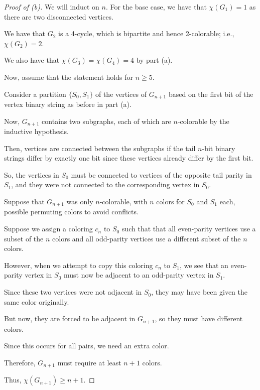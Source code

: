 \documentclass[../hw7]{subfiles}
\begin{document}
\begin{proof}[Proof of (b)]
	We will induct on $n$.
	For the base case, we have that $\chi(G_1)=1$ as there are two disconnected vertices.

	We have that $G_2$ is a 4-cycle, which is bipartite and hence 2-colorable; i.e., $\chi(G_2)=2$.

	We also have that $\chi(G_3)=\chi(G_4)=4$ by part (a).

	Now, assume that the statement holds for $n\ge 5$.

	Consider a partition $\{S_0,S_1\} $ of the vertices of $G_{n+1}$ based on the first bit of the vertex binary string as before in part (a).

	Now, $G_{n+1}$ contains two subgraphs, each of which are $n$-colorable by the inductive hypothesis.

	Then, vertices are connected between the subgraphs if the tail $n$-bit binary strings differ by exactly one bit since these vertices already differ by the first bit.

	So, the vertices in $S_0$ must be connected to vertices of the opposite tail parity in $S_1$, and they were not connected to the corresponding vertex in $S_0$.

	Suppose that $G_{n+1}$ was only $n$-colorable, with $n$ colors for $S_{0}$ and $S_1$ each, possible permuting colors to avoid conflicts.

	Suppose we assign a coloring $c_n$ to $S_0$ such that that all even-parity vertices use a subset of the $n$ colors and all odd-parity vertices use a different subset of the $n$ colors.

	However, when we attempt to copy this coloring $c_n$ to $S_1$, we see that an even-parity vertex in $S_0$ must now be adjacent to an odd-parity vertex in $S_1$.

	Since these two vertices were not adjacent in $S_0$, they may have been given the same color originally.

	But now, they are forced to be adjacent in $G_{n+1}$, so they must have different colors.

	Since this occurs for all pairs, we need an extra color.

	Therefore, $G_{n+1}$ must require at least $n+1$ colors.

	Thus, $\chi(G_{n+1})\ge n+1$.
\end{proof}
\end{document}
